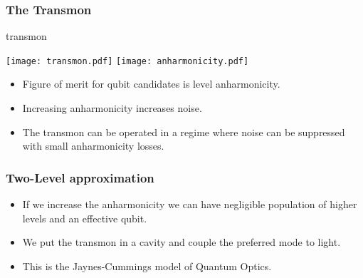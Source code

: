 \documentclass{beamer}
\begin{document}
\begin{frame}
    \frametitle{The Transmon}

    \begin{block}{transmon}

    \texttt{[image: transmon.pdf]}
    \texttt{[image: anharmonicity.pdf]}

    \end{block}
    \begin{block}
        \begin{itemize}

            \item Figure of merit for qubit candidates is level 
                    anharmonicity. 
            \item Increasing anharmonicity increases noise.
            \item The transmon can be operated in a regime where noise 
                    can be suppressed with small anharmonicity losses. 
                    
        \end{itemize}
    \end{block}

\end{frame}
\begin{frame}

    \frametitle{Two-Level approximation}

    \begin{itemize}
        \item If we increase the anharmonicity we can have negligible 
                population of higher levels and an effective qubit.
        \item We put the transmon in a cavity and couple 
                the preferred mode to light.
        \item This is the Jaynes-Cummings model of Quantum Optics. 
    \end{itemize}

\end{frame}
\end{document}

